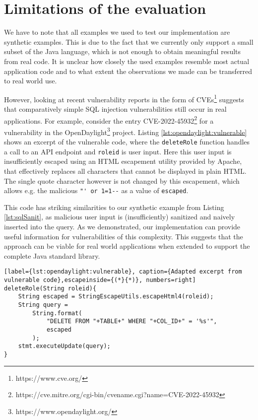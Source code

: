 \section{Limitations of the evaluation}\label{sec:discussion:limitations}

We have to note that all examples we used to test our implementation are synthetic examples. This is due to the fact that we currently only support a small subset of the Java language, which is not enough to obtain meaningful results from real code. It is unclear how closely the used examples resemble most actual application code and to what extent the observations we made can be transferred to real world use.

However, looking at recent vulnerability reports in the form of CVEs\footnote{https://www.cve.org/} suggests that comparatively simple SQL injection vulnerabilities still occur in real applications. For example, consider the entry CVE-2022-45932\footnote{https://cve.mitre.org/cgi-bin/cvename.cgi?name=CVE-2022-45932} for a vulnerability in the OpenDaylight\footnote{https://www.opendaylight.org/} project.
Listing \ref{lst:opendaylight:vulnerable} shows an excerpt of the vulnerable code, where the \lstinline|deleteRole| function handles a call to an API endpoint and \lstinline|roleid| is user input. Here this user input is insufficiently escaped using an HTML escapement utility provided by Apache, that effectively replaces all characters that cannot be displayed in plain HTML. The single quote character however is not changed by this escapement, which allows e.g. the malicious \lstinline|"' or 1=1--| as a value of \lstinline|escaped|. 

This code has striking similarities to our synthetic example from Listing \ref{lst:sqlSanit}, as malicious user input is (insufficiently) sanitized and naively inserted into the query. As we demonstrated, our implementation can provide useful information for vulnerabilities of this complexity. This suggests that the approach can be viable for real world applications when extended to support the complete Java standard library.

\begin{lstlisting}[label={lst:opendaylight:vulnerable}, caption={Adapted excerpt from vulnerable code},escapeinside={(*}{*)}, numbers=right]
deleteRole(String roleid){
	String escaped = StringEscapeUtils.escapeHtml4(roleid);
	String query = 
		String.format(
			"DELETE FROM "+TABLE+" WHERE "+COL_ID+" = '%s'", 
			escaped
		);
	stmt.executeUpdate(query);
}       
\end{lstlisting}

